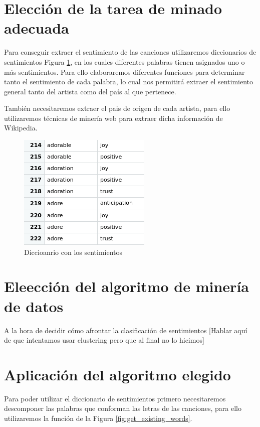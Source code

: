\section{Elección de la tarea de minado adecuada}

Para conseguir extraer el sentimiento de las canciones utilizaremos diccionarios de sentimientos Figura \ref{fig:diccionariosentimientos}, en los cuales diferentes palabras tienen asignados uno o más sentimientos. Para ello elaboraremos diferentes funciones para determinar tanto el sentimiento de cada palabra, lo cual nos permitirá extraer el sentimiento general tanto del artista como del país al que pertenece.

También necesitaremos extraer el pais de origen de cada artista, para ello utilizaremos técnicas de minería web para extraer dicha información de Wikipedia.

\begin{figure}[h!]
	\centering
	\includegraphics[width=0.6\linewidth]{Imagenes/diccionariosentimientos}
	\caption{Diccioanrio con los sentimientos}
	\label{fig:diccionariosentimientos}
\end{figure}

\section{Eleección del algoritmo de minería de datos}

A la hora de decidir cómo afrontar la clasificación de sentimientos [Hablar aquí de que intentamos usar clustering pero que al final no lo hicimos]

\section{Aplicación del algoritmo elegido}

Para poder utilizar el diccionario de sentimientos primero necesitaremos descomponer las palabras que conforman las letras de las canciones, para ello utilizaremos la función de la Figura \ref{fig:get_existing_words}. 

